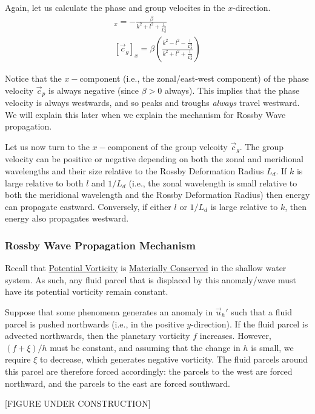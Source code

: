 Again, let us calculate the phase and group velocites in the \(x\)-direction.
\begin{align*}
    [\vec{c}_p]_x = -\frac{\beta}{k^2+l^2+\frac{1}{L_d^2}}
    \\
    [\vec{c}_g]_x = \beta\left( \frac{k^2-l^2-\frac{1}{L_d^2}}{k^2+l^2+\frac{1}{L_d^2}} \right)
\end{align*}

Notice that the \(x-\)component (i.e., the zonal/east-west component) of the phase velocity \(\vec{c}_p\) is always negative (since \(\beta>0\) always). This implies that the phase velocity is always westwards, and so peaks and troughs \textit{always} travel westward. We will explain this later when we explain the mechanism for Rossby Wave propagation.

Let us now turn to the \(x-\)component of the group velcoity \(\vec{c}_g\). The group velocity can be positive or negative depending on both the zonal and meridional wavelengths and their size relative to the Rossby Deformation Radius \(L_d\). If \(k\) is large relative to both \(l\) and \(1/L_d\) (i.e., the zonal wavelength is small relative to both the meridional wavelength and the Rossby Deformation Radius) then energy can propagate eastward. Conversely, if either \(l\) or \(1/L_d\) is large relative to \(k\), then energy also propagates westward.

\subsubsection{Rossby Wave Propagation Mechanism}

Recall that \hyperref[PV]{Potential Vorticity} is \hyperref[Cons PV Box]{Materially Conserved} in the shallow water system. As such, any fluid parcel that is displaced by this anomaly/wave must have its potential vorticity remain constant.

Suppose that some phenomena generates an anomaly in \(\vec{u}_h'\) such that a fluid parcel is pushed northwards (i.e., in the positive \(y\)-direction). If the fluid parcel is advected northwards, then the planetary vorticity \(f\) increases. However, \((f+\xi)/h\) must be constant, and assuming that the change in \(h\) is small, we require \(\xi\) to decrease, which generates negative vorticity. The fluid parcels around this parcel are therefore forced accordingly: the parcels to the west are forced northward, and the parcels to the east are forced southward.

[FIGURE UNDER CONSTRUCTION]

